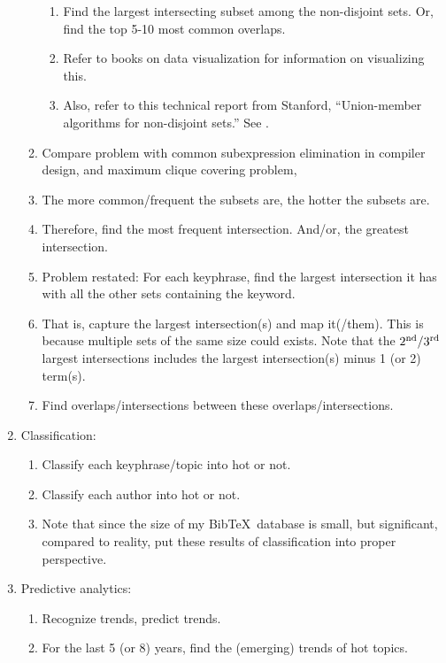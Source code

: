 \begin{enumerate}
\begin{enumerate}
\begin{enumerate}
		\item Find the largest intersecting subset among the non-disjoint sets. Or, find the top 5-10 most common overlaps.
		\item Refer to books on data visualization for information on visualizing this.
		\item Also, refer to this technical report from Stanford, ``Union-member algorithms for non-disjoint sets.'' See \cite{Shiloach1979}.
		\end{enumerate}
	\item Compare problem with common subexpression elimination in compiler design, and maximum clique covering problem,
	\item The more common/frequent the subsets are, the hotter the subsets are.
	\item Therefore, find the most frequent intersection. And/or, the greatest intersection.
	\item Problem restated: For each keyphrase, find the largest intersection it has with all the other sets containing the keyword.
	\item That is, capture the largest intersection(s) and map it(/them). This is because multiple sets of the same size could exists. Note that the $2^{\rm nd}/3^{\rm rd}$ largest intersections includes the largest intersection(s) minus 1 (or 2) term(s).
	\item Find overlaps/intersections between these overlaps/intersections.
	\end{enumerate}
\item Classification: \vspace{-0.3cm}
	\begin{enumerate} \itemsep -2pt
	\item Classify each keyphrase/topic into hot or not.
	\item Classify each author into hot or not.
	\item Note that since the size of my {\sc Bib}\TeX\ database is small, but significant, compared to reality, put these results of classification into proper perspective.
	\end{enumerate}
\item Predictive analytics: \vspace{-0.3cm}
	\begin{enumerate} \itemsep -2pt
	\item Recognize trends, predict trends.
	\item For the last 5 (or 8) years, find the (emerging) trends of hot topics.
	\end{enumerate}

\end{enumerate}
